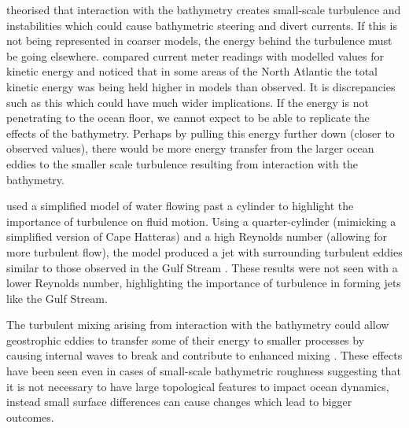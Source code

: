 \documentclass[..\EOYR.tex]{subfiles}
\begin{document}
\citep{NaveiraGarabato2013} theorised that interaction with the bathymetry creates small-scale turbulence and instabilities which could cause bathymetric steering and divert currents. If this is not being represented in coarser models, the energy behind the turbulence must be going elsewhere. \citep{Scott2010} compared current meter readings with modelled values for kinetic energy and noticed that in some areas of the North Atlantic the total kinetic energy was being held higher in models than observed. It is discrepancies such as this which could have much wider implications. If the energy is not penetrating to the ocean floor, we cannot expect to be able to replicate the effects of the bathymetry. Perhaps by pulling this energy further down (closer to observed values), there would be more energy transfer from the larger ocean eddies to the smaller scale turbulence resulting from interaction with the bathymetry.

\citep{Tansley2001} used a simplified model of water flowing past a cylinder to highlight the importance of turbulence on fluid motion. 
Using a quarter-cylinder (mimicking a simplified version of Cape Hatteras) and a high Reynolds number (allowing for more turbulent flow), the model produced a jet with surrounding turbulent eddies similar to those observed in the Gulf Stream
. These results were not seen with a lower Reynolds number, highlighting the importance of turbulence in forming jets like the Gulf Stream.


The turbulent mixing arising from interaction with the bathymetry could allow geostrophic eddies to transfer some of their energy to smaller processes by causing internal waves to break and contribute to enhanced mixing \citep{Nikurashin2012a}. These effects have been seen even in cases of small-scale bathymetric roughness suggesting that it is not necessary to have large topological features to impact ocean dynamics, instead small surface differences can cause changes which lead to bigger outcomes.
\end{document}
